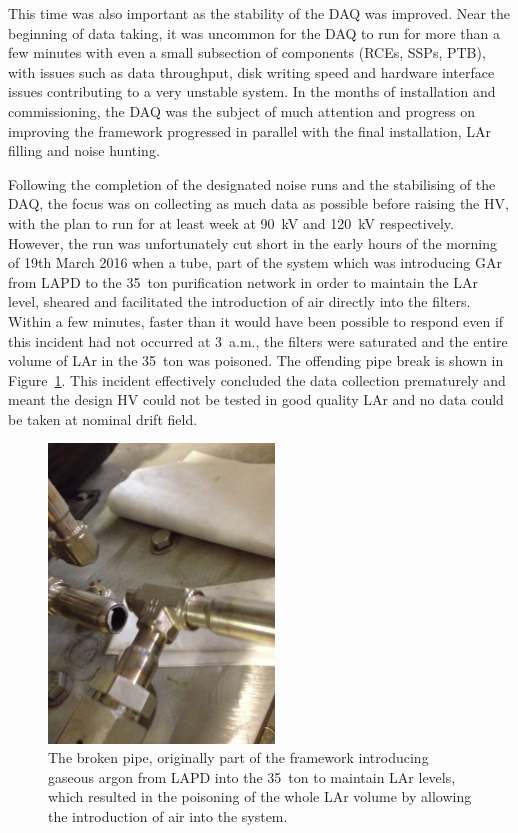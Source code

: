This time was also important as the stability of the DAQ was improved.  Near the beginning of data taking, it was uncommon for the DAQ to run for more than a few minutes with even a small subsection of components (RCEs, SSPs, PTB), with issues such as data throughput, disk writing speed and hardware interface issues contributing to a very unstable system.  In the months of installation and commissioning, the DAQ was the subject of much attention and progress on improving the framework progressed in parallel with the final installation, LAr filling and noise hunting.

Following the completion of the designated noise runs and the stabilising of the DAQ, the focus was on collecting as much data as possible before raising the HV, with the plan to run for at least week at 90~kV and 120~kV respectively.  However, the run was unfortunately cut short in the early hours of the morning of 19th March 2016 when a tube, part of the system which was introducing GAr from LAPD to the 35~ton purification network in order to maintain the LAr level, sheared and facilitated the introduction of air directly into the filters.  Within a few minutes, faster than it would have been possible to respond even if this incident had not occurred at 3~a.m., the filters were saturated and the entire volume of LAr in the 35~ton was poisoned.  The offending pipe break is shown in Figure~\ref{fig:35tonPipeBreak}.  This incident effectively concluded the data collection prematurely and meant the design HV could not be tested in good quality LAr and no data could be taken at nominal drift field.

\begin{figure}
  \centering
  \includegraphics[width=6cm]{35tonPipeBreak.png}
  \caption[The broken pipe, originally part of the framework introducing gaseous argon from LAPD into the 35~ton to maintain LAr levels, which resulted in the poisoning of the whole LAr volume by allowing the introduction of air into the system.]{The broken pipe, originally part of the framework introducing gaseous argon from LAPD into the 35~ton to maintain LAr levels, which resulted in the poisoning of the whole LAr volume by allowing the introduction of air into the system.}
  \label{fig:35tonPipeBreak}
\end{figure}


